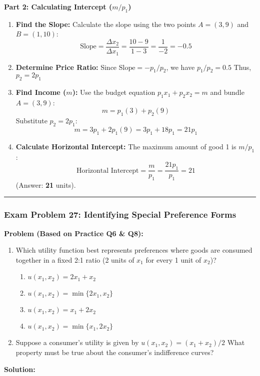 \documentclass{article}
\begin{document}
\textbf{Part 2: Calculating Intercept ($m/p_1$)}
\begin{enumerate}
    \item \textbf{Find the Slope:} Calculate the slope using the two points $A=(3, 9)$ and $B=(1, 10)$:
    \[\text{Slope} = \frac{\Delta x_2}{\Delta x_1} = \frac{10 - 9}{1 - 3} = \frac{1}{-2} = -0.5\]
    \item \textbf{Determine Price Ratio:} Since $\text{Slope} = -p_1/p_2$, we have $p_1/p_2 = 0.5$ Thus, $p_2 = 2p_1$
    \item \textbf{Find Income ($m$):} Use the budget equation $p_1 x_1 + p_2 x_2 = m$ and bundle $A=(3, 9)$:
    \[ m = p_1(3) + p_2(9) \]
    Substitute $p_2 = 2p_1$:
    \[ m = 3p_1 + 2p_1(9) = 3p_1 + 18p_1 = 21p_1 \]
    \item \textbf{Calculate Horizontal Intercept:} The maximum amount of good 1 is $m/p_1$:
    \[\text{Horizontal Intercept} = \frac{m}{p_1} = \frac{21 p_1}{p_1} = 21\]
    (Answer: \textbf{21} units).
\end{enumerate}

\bigskip\hrule\bigskip

\subsubsection*{Exam Problem 27: Identifying Special Preference Forms}

\textbf{Problem (Based on Practice Q6 \& Q8):}
\begin{enumerate}
    \item Which utility function best represents preferences where goods are consumed together in a fixed 2:1 ratio (2 units of $x_1$ for every 1 unit of $x_2$)?
    \begin{enumerate}
        \renewcommand{\theenumii}{\alph{enumii}}
        \renewcommand{\labelenumii}{(\theenumii)}
        \item $u(x_1, x_2) = 2x_1 + x_2$
        \item $u(x_1, x_2) = \min\{2x_1, x_2\}$
        \item $u(x_1, x_2) = x_1 + 2x_2$
        \item $u(x_1, x_2) = \min\{x_1, 2x_2\}$
    \end{enumerate}
    \item Suppose a consumer's utility is given by $u(x_1, x_2) = (x_1 + x_2)/2$ What property must be true about the consumer's indifference curves?
\end{enumerate}

\textbf{Solution:}
\end{document}
